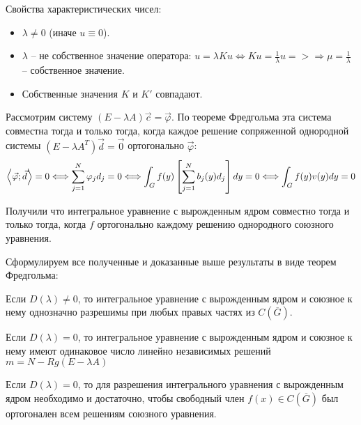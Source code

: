 Свойства характеристических чисел:
\begin{itemize}
  \item $\lambda \neq 0$ (иначе $u \equiv 0$).
  \item $\lambda$ -- не собственное значение оператора: $u = \lambda K u \Leftrightarrow Ku = \frac{1}{\lambda}u => \Rightarrow \mu = \frac{1}{\lambda}$ -- собственное значение.
  \item Собственные значения $K$ и $K'$ совпадают.
\end{itemize}

Рассмотрим систему $(E - \lambda A)\vec{c} = \vec{\varphi}$.
По теореме Фредгольма эта система совместна тогда и только тогда, когда каждое решение сопряженной однородной системы $(E - \lambda A^{T})\vec{d} = \vec{0}$ ортогонально $\vec{\varphi}$:
$$\left\langle \vec{\varphi}; \vec{d} \right\rangle = 0 \Longleftrightarrow \sum_{j=1}^{N}\varphi_{j}d_{j} = 0 \Longleftrightarrow \int_{G}f(y)\left[\sum_{j = 1}^{N}b_{j}(y)d_{j}\right]dy = 0 \Longleftrightarrow \int_{G}f(y)v(y)dy = 0$$

Получили что интегральное уравнение с вырожденным ядром совместно тогда и только тогда, когда $f$ ортогонально каждому решению однородного союзного уравнения.

Сформулируем все полученные и доказанные выше результаты в виде теорем Фредгольма:

\begin{theorem}
  Если $D(\lambda) \neq 0$, то интегральное уравнение с вырожденным ядром и союзное к нему однозначно разрешимы при любых правых частях из $C(\overline{G})$.
\end{theorem}
\begin{theorem}
   Если $D(\lambda) = 0$, то интегральное уравнение с вырожденным ядром и союзное к нему имеют одинаковое число линейно независимых решений $m = N - Rg(E - \lambda A)$
\end{theorem}
\begin{theorem}
  Если $D(\lambda) = 0$, то для разрешения интегрального уравнения с вырожденным ядром необходимо и достаточно, чтобы свободный член $f(x) \in C(\overline{G})$ был ортогонален всем решениям союзного уравнения.
\end{theorem}